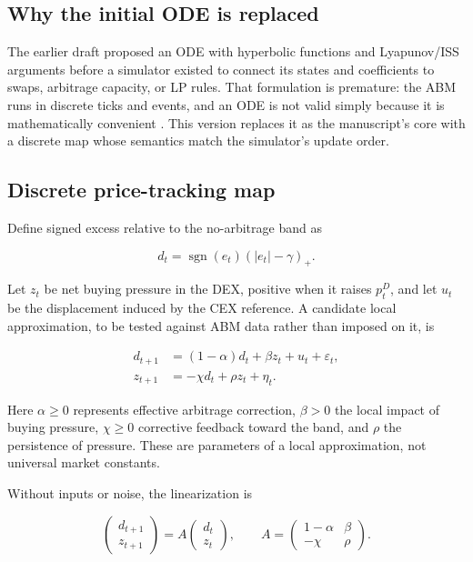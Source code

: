 \subsection{Why the initial ODE is replaced}

The earlier draft proposed an ODE with hyperbolic functions and Lyapunov/ISS
arguments before a simulator existed to connect its states and coefficients to swaps,
arbitrage capacity, or LP rules. That formulation is premature: the ABM runs in
discrete ticks and events, and an ODE is not valid simply because it is mathematically
convenient \cite{roubal2010linearization}. This version replaces it as the manuscript's
core with a discrete map whose semantics match the simulator's update order.

\subsection{Discrete price-tracking map}

Define signed excess relative to the no-arbitrage band as

\begin{equation}
  d_t=\operatorname{sgn}(e_t)(|e_t|-\gamma)_+.
\end{equation}

Let $z_t$ be net buying pressure in the DEX, positive when it raises $p_t^D$, and let
$u_t$ be the displacement induced by the CEX reference. A candidate local
approximation, to be tested against ABM data rather than imposed on it, is

\begin{align}
  d_{t+1}&=(1-\alpha)d_t+\beta z_t+u_t+\varepsilon_t,\\
  z_{t+1}&=-\chi d_t+\rho z_t+\eta_t.
\end{align}

Here $\alpha\geq0$ represents effective arbitrage correction, $\beta>0$ the local
impact of buying pressure, $\chi\geq0$ corrective feedback toward the band, and
$\rho$ the persistence of pressure. These are parameters of a local approximation,
not universal market constants.

Without inputs or noise, the linearization is

\begin{equation}
  \begin{pmatrix} d_{t+1}\\ z_{t+1} \end{pmatrix}
  =A\begin{pmatrix} d_t\\ z_t \end{pmatrix},\qquad
  A=\begin{pmatrix}1-\alpha&\beta\\-\chi&\rho\end{pmatrix}.
\end{equation}

